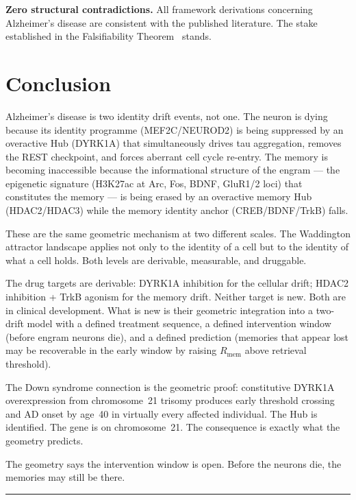 \documentclass[12pt,a4paper]{article}
\newcommand{\RMEM}{R_{\mathrm{mem}}}
\begin{document}
\noindent\textbf{Zero structural contradictions.}
All framework derivations concerning Alzheimer's disease
are consistent with the published literature. The stake
established in the Falsifiability Theorem~\cite{FalsThm2026}
stands.

\section{Conclusion}

Alzheimer's disease is two identity drift events, not one.
The neuron is dying because its identity programme
(MEF2C/NEUROD2) is being suppressed by an overactive Hub
(DYRK1A) that simultaneously drives tau aggregation,
removes the REST checkpoint, and forces aberrant cell
cycle re-entry. The memory is becoming inaccessible
because the informational structure of the engram ---
the epigenetic signature (H3K27ac at Arc, Fos, BDNF,
GluR1/2 loci) that constitutes the memory --- is being
erased by an overactive memory Hub (HDAC2/HDAC3) while
the memory identity anchor (CREB/BDNF/TrkB) falls.

These are the same geometric mechanism at two different
scales. The Waddington attractor landscape applies not
only to the identity of a cell but to the identity of
what a cell holds. Both levels are derivable, measurable,
and druggable.

The drug targets are derivable: DYRK1A inhibition for
the cellular drift; HDAC2 inhibition + TrkB agonism
for the memory drift. Neither target is new. Both are
in clinical development. What is new is their geometric
integration into a two-drift model with a defined
treatment sequence, a defined intervention window
(before engram neurons die), and a defined prediction
(memories that appear lost may be recoverable in the
early window by raising $\RMEM$ above retrieval threshold).

The Down syndrome connection is the geometric proof:
constitutive DYRK1A overexpression from chromosome~21
trisomy produces early threshold crossing and AD
onset by age~40 in virtually every affected individual.
The Hub is identified. The gene is on chromosome~21.
The consequence is exactly what the geometry predicts.

The geometry says the intervention window is open.
Before the neurons die, the memories may still be there.

\bigskip\noindent\rule{\linewidth}{0.5pt}
\end{document}
